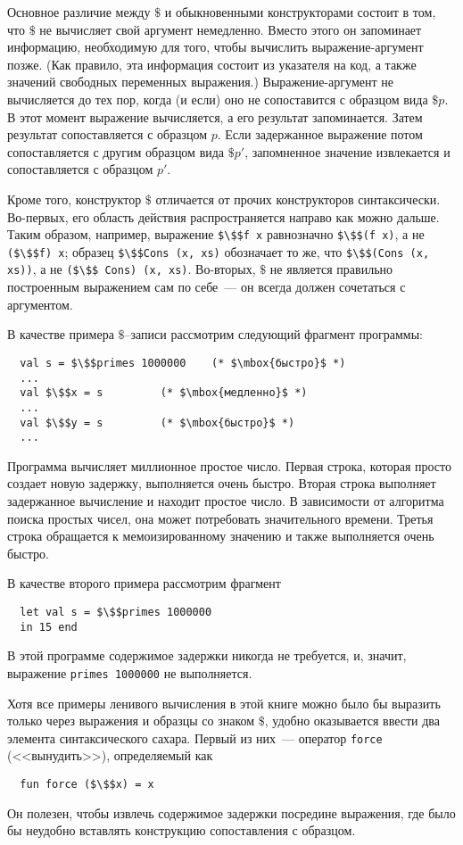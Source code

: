 Основное различие между $\$$ и обыкновенными конструкторами состоит в
том, что $\$$ не вычисляет свой аргумент немедленно.  Вместо этого он
запоминает информацию, необходимую для того, чтобы вычислить
выражение-аргумент позже. (Как правило, эта информация состоит из
указателя на код, а также значений свободных переменных выражения.)
Выражение-аргумент не вычисляется до тех пор, когда (и если) оно не
сопоставится с образцом вида $\$p$.  В этот момент выражение
вычисляется, а его результат запоминается. Затем результат
сопоставляется с образцом $p$. Если задержанное выражение потом
сопоставляется с другим образцом вида $\$p'$, запомненное значение
извлекается и сопоставляется с образцом $p'$.

Кроме того, конструктор $\$$ отличается от прочих конструкторов
синтаксически. Во-первых, его область действия распространяется
направо как можно дальше. Таким образом, например, выражение
\lstinline!$\$$f x! равнозначно \lstinline!$\$$(f x)!, а не
\lstinline!($\$$f) x!; образец \lstinline!$\$$Cons (x, xs)! обозначает
то же, что \lstinline!$\$$(Cons (x, xs))!, а не
\lstinline!($\$$ Cons) (x, xs)!. Во-вторых, $\$$ не является правильно
построенным выражением сам по себе~--- он всегда должен сочетаться с
аргументом.

В качестве примера $\$$--записи рассмотрим следующий фрагмент
программы:
\begin{lstlisting}
  val s = $\$$primes 1000000	(* $\mbox{быстро}$ *)
  ...
  val $\$$x = s			(* $\mbox{медленно}$ *)
  ...
  val $\$$y = s			(* $\mbox{быстро}$ *)
  ...
\end{lstlisting}
Программа вычисляет миллионное простое число. Первая строка, которая
просто создает новую задержку, выполняется очень
быстро.  Вторая строка выполняет задержанное вычисление и
находит простое число. В зависимости от алгоритма
поиска простых чисел, она может потребовать значительного
времени.  Третья строка обращается к мемоизированному значению и также
выполняется очень быстро.

В качестве второго примера рассмотрим фрагмент
\begin{lstlisting}
  let val s = $\$$primes 1000000
  in 15 end
\end{lstlisting}
В этой программе содержимое задержки никогда не
требуется, и, значит, выражение \lstinline!primes 1000000! не
выполняется.

Хотя все примеры ленивого вычисления в этой книге можно было бы
выразить только через выражения и образцы со знаком $\$$, удобно
оказывается ввести два элемента синтаксического сахара. Первый из них~---
оператор \lstinline!force! (<<вынудить>>), определяемый как
\begin{lstlisting}
  fun force ($\$$x) = x
\end{lstlisting}
Он полезен, чтобы извлечь содержимое задержки посредине
выражения, где было бы неудобно вставлять конструкцию сопоставления с
образцом.

